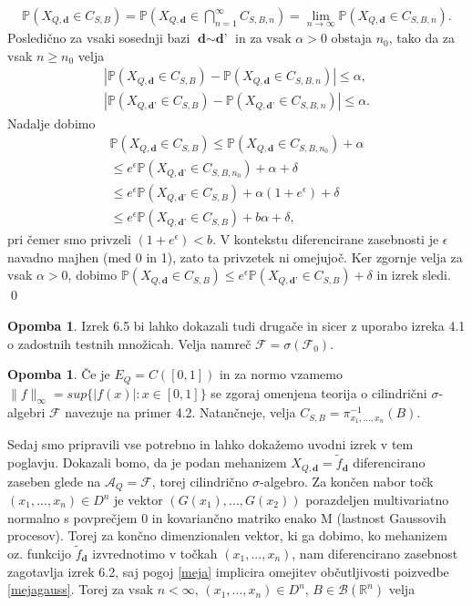 \documentclass[12pt,a4paper]{amsart}
\theoremstyle{definition} %
\newtheorem{opomba}[definicija]{Opomba}
\theoremstyle{plain} %
\begin{document}
\begin{gather*}
\mathbb{P}(X_{Q,\textbf{d}} \in C_{S,B}) = \mathbb{P}(X_{Q,\textbf{d}} \in  \bigcap_{n=1}^{\infty}C_{S,B,n}) = \lim_{n \rightarrow \infty} \mathbb{P}(X_{Q,\textbf{d}} \in C_{S,B,n}).
\end{gather*}
Posledično za vsaki sosednji bazi $\textbf{d} \sim \textbf{d'}$ in za vsak $\alpha > 0$ obstaja $n_0$, tako da za vsak $n \geq n_0$ velja
\begin{gather*}
|\mathbb{P}(X_{Q,\textbf{d}} \in C_{S,B}) - \mathbb{P}(X_{Q,\textbf{d}} \in C_{S,B,n})| \leq  \alpha, \\ |\mathbb{P}(X_{Q,\textbf{d'}} \in C_{S,B}) - \mathbb{P}(X_{Q,\textbf{d'}} \in C_{S,B,n})| \leq \alpha.
\end{gather*}
Nadalje dobimo
\begin{gather*}
\mathbb{P}(X_{Q,\textbf{d}} \in C_{S,B})  \leq \mathbb{P}(X_{Q,\textbf{d}} \in C_{S,B, n_0}) + \alpha \\ \leq e^{\epsilon} \mathbb{P}(X_{Q,\textbf{d'}} \in C_{S,B,n_0})  + \alpha + \delta \\ \leq e^{\epsilon} \mathbb{P}(X_{Q,\textbf{d'}} \in C_{S,B})  + \alpha(1 + e^{\epsilon}) + \delta \\ \leq e^{\epsilon} \mathbb{P}(X_{Q,\textbf{d'}} \in C_{S,B})  + b \alpha + \delta,
\end{gather*}
pri čemer smo privzeli $(1+e^{\epsilon}) < b$. V kontekstu diferencirane zasebnosti je $\epsilon$ navadno majhen (med 0 in 1), zato ta privzetek ni omejujoč. Ker zgornje velja za vsak $\alpha > 0$, dobimo $\mathbb{P}(X_{Q,\textbf{d}} \in C_{S,B}) \leq e^{\epsilon} \mathbb{P}(X_{Q,\textbf{d'}} \in C_{S,B}) + \delta$ in izrek sledi.
\qed
\newline
\begin{opomba}
Izrek 6.5 bi lahko dokazali tudi drugače in sicer z uporabo izreka 4.1 o zadostnih testnih množicah. Velja namreč $\mathcal{F} = \sigma(\mathcal{F}_0).$
\end{opomba}
\begin{opomba}
Če je $E_Q = C ([0,1])$ in za normo vzamemo $\|f\|_{\infty} = sup\{|f(x)| : x \in [0,1]\}$ se zgoraj omenjena teorija o cilindrični $\sigma$-algebri $\mathcal{F}$ navezuje na primer 4.2. Natančneje, velja $C_{S,B} = \pi_{x_1,...,x_n}^{-1} (B).$
\end{opomba}
Sedaj smo pripravili vse potrebno in lahko dokažemo uvodni izrek v tem poglavju.
Dokazali bomo, da je podan mehanizem $X_{Q,\textbf{d}} = \tilde{f}_{\textbf{d}}$ diferencirano zaseben glede na $\mathcal{A}_Q = \mathcal{F}$, torej cilindrično $\sigma$-algebro. Za končen nabor točk $(x_1,...,x_n) \in D^n$ je vektor $(G(x_1),...,G(x_2))$ porazdeljen multivariatno normalno s povprečjem 0 in kovariančno matriko enako M (lastnost Gaussovih procesov). Torej za končno dimenzionalen vektor, ki ga dobimo, ko mehanizem oz. funkcijo $\tilde{f}_{\textbf{d}}$ izvrednotimo v točkah $(x_1,...,x_n) $, nam diferencirano zasebnost zagotavlja izrek 6.2, saj pogoj \eqref{meja} implicira omejitev občutljivosti poizvedbe \eqref{mejagauss}. Torej za vsak $n < \infty$, $(x_1,...,x_n) \in D^n$, $B \in \mathcal{B}(\mathbb{R}^n)$ velja
\end{document}
